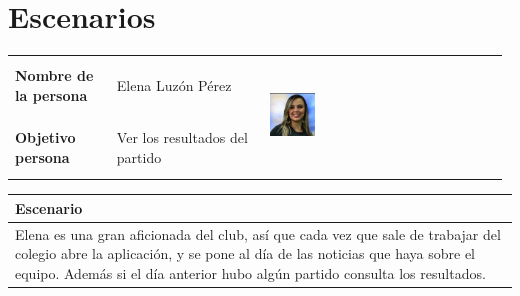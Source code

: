 \documentclass[11pt]{article}
\begin{document}
\section{Escenarios}
\begin{table}[H]
  \centering
  \begin{tabular}{p{0.2\linewidth}|p{0.3\linewidth}p{0.475\linewidth}}
    \toprule
    \textbf{Nombre de la persona} & Elena Luzón Pérez &\multirow{2}{*}{\begin{minipage}{1.\textwidth}\includegraphics[width=0.2\textwidth, height=30mm]{Elena}\end{minipage}}\\
    \textbf{Objetivo persona} & Ver los resultados del partido & \\
    \bottomrule
  \end{tabular}

\begin{tabular}{p{1.028\linewidth}}
  \textbf{Escenario}\\
  \midrule
  Elena es una gran aficionada del club, así que cada vez que sale de trabajar del colegio abre la aplicación, y se pone al día de las noticias que haya sobre el equipo. Además si el día anterior hubo algún partido consulta los resultados.
\end{tabular}
\end{table}
\end{document}
